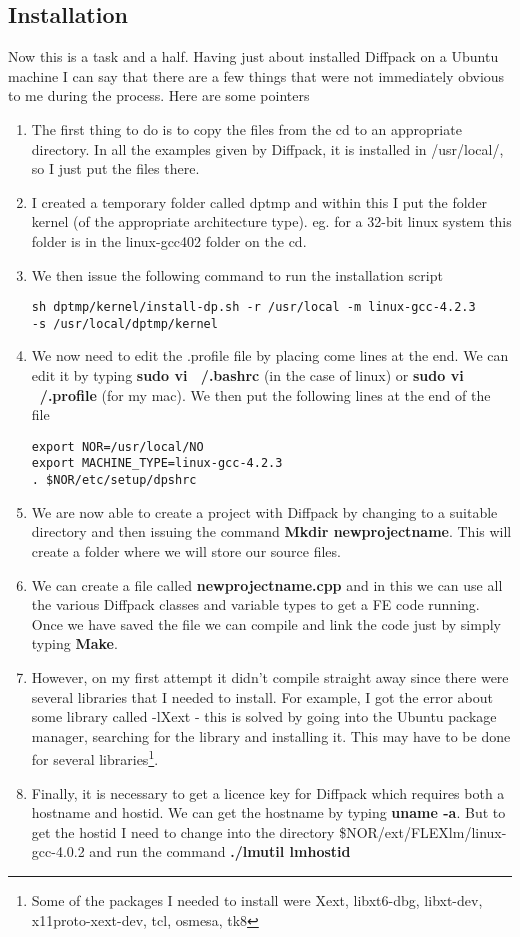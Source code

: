 \documentclass[a4paper, 10pt]{article}
\begin{document}
\subsection*{Installation}
Now this is a task and a half. Having just about installed Diffpack on a Ubuntu machine I can say that there are a few things that were not immediately obvious to me during the process. Here are some pointers
\begin{enumerate}
\item The first thing to do is to copy the files from the cd to an appropriate directory. In all the examples given by Diffpack, it is installed in /usr/local/, so I just put the files there.
\item I created a temporary folder called dptmp and within this I put the folder kernel (of the appropriate architecture type). eg. for a 32-bit linux system this folder is in the linux-gcc402 folder on the cd.
\item We then issue the following command to run the installation script 
\begin{verbatim}
sh dptmp/kernel/install-dp.sh -r /usr/local -m linux-gcc-4.2.3 
-s /usr/local/dptmp/kernel
\end{verbatim}
\item We now need to edit the .profile file by placing come lines at the end. We can edit it by typing {\bf sudo vi ~/.bashrc} (in the case of linux) or {\bf sudo vi ~/.profile} (for my mac). We then put the following lines at the end of the file
\begin{verbatim}
export NOR=/usr/local/NO
export MACHINE_TYPE=linux-gcc-4.2.3
. $NOR/etc/setup/dpshrc
\end{verbatim} 
\item We are now able to create a project with Diffpack by changing to a suitable directory and then issuing the command {\bf Mkdir newprojectname}. This will create a folder where we will store our source files. 
\item We can create a file called {\bf newprojectname.cpp} and in this we can use all the various Diffpack classes and variable types to get a FE code running. Once we have saved the file we can compile and link the code just by simply typing {\bf Make}.
\item However, on my first attempt it didn't compile straight away since there were several libraries that I needed to install. For example, I got the error about some library called -lXext - this is solved by going into the Ubuntu package manager, searching for the library and installing it. This may have to be done for several libraries\footnote{Some of the packages I needed to install were Xext, libxt6-dbg, libxt-dev, x11proto-xext-dev, tcl, osmesa, tk8}.
\item Finally, it is necessary to get a licence key for Diffpack which requires both a hostname and hostid. We can get the hostname by typing {\bf uname -a}. But to get the hostid I need to change into the directory \$NOR/ext/FLEXlm/linux-gcc-4.0.2 and run the command {\bf ./lmutil lmhostid}
\end{enumerate}
\end{document}
